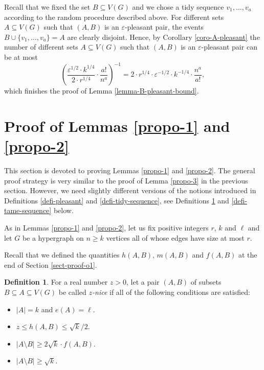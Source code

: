 \documentclass[11pt]{article}
\theoremstyle{definition}
\newtheorem{definition}[theorem]{Definition}
\numberwithin{equation}{section}
\begin{document}
Recall that we fixed the set $B\subseteq V(G)$ and we chose a tidy sequence $v_1,\dots,v_a$ according to the random procedure described above. For different sets $A\subseteq V(G)$ such that $(A,B)$ is an $\varepsilon$-pleasant pair, the events $B\cup \lbrace v_1,\dots,v_a\rbrace=A$ are clearly disjoint. Hence, by Corollary \ref{coro-A-pleasant} the number of different sets $A\subseteq V(G)$ such that $(A,B)$ is an $\varepsilon$-pleasant pair can be at most
\[\left(\frac{\varepsilon^{1/2}\cdot k^{1/4}}{2\cdot r^{1/4}}\cdot \frac{a!}{n^a}\right)^{-1}=2\cdot r^{1/4}\cdot \varepsilon^{-1/2}\cdot k^{-1/4}\cdot \frac{n^a}{a!},\]
which finishes the proof of Lemma \ref{lemma-B-pleasant-bound}.

\section{Proof of Lemmas \ref{propo-1} and \ref{propo-2}}\label{sect-proof-propo-1-2}

This section is devoted to proving Lemmas \ref{propo-1} and \ref{propo-2}. The general proof strategy is very similar to the proof of Lemma \ref{propo-3} in the previous section. However, we need slightly different versions of the notions introduced in Definitions \ref{defi-pleasant} and \ref{defi-tidy-sequence}, see Definitions \ref{defi-nice} and \ref{defi-tame-sequence} below.

As in Lemmas \ref{propo-1} and \ref{propo-2}, let us fix positive integers $r$, $k$ and $\ell$ and let $G$ be a hypergraph on $n \geq k$ vertices all of whose edges have size at most $r$. 

Recall that we defined the quantities $h(A,B)$, $m(A, B)$ and $f(A,B)$ at the end of Section \ref{sect-proof-o1}.

\begin{definition}\label{defi-nice}For a real number $z>0$, let a pair $(A,B)$ of subsets $B\subseteq A\subseteq V(G)$ be called \emph{$z$-nice} if all of the following conditions are satisfied:
\begin{itemize}
\item[(i)] $\vert A\vert=k$ and $e(A)=\ell$.
\item[(ii)] $z\leq h(A,B)\leq \sqrt{k}/2$.
\item[(iii)] $\vert A\setminus B\vert\geq 2\sqrt{k}\cdot f(A,B)$.
\item[(iv)] $\vert A\setminus B\vert\geq \sqrt{k}$.
\end{itemize}
\end{definition}
\end{document}
